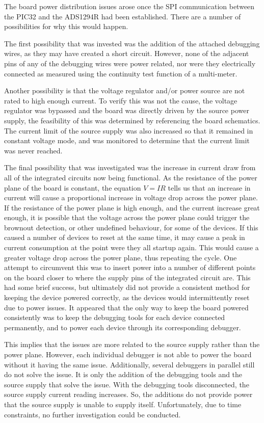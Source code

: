 The board power distribution issues arose once the SPI communication between the PIC32 and the ADS1294R had been established.
There are a number of possibilities for why this would happen.

The first possibility that was invested was the addition of the attached debugging wires, as they may have created a short circuit.
However, none of the adjacent pins of any of the debugging wires were power related,
nor were they electrically connected as measured using the continuity test function of a multi-meter.

Another possibility is that the voltage regulator and/or power source are not rated to high enough current.
To verify this was not the cause, the voltage regulator was bypassed and the board was directly driven by the source power supply,
the feasibility of this was determined by referencing the board schematics.
The current limit of the source supply was also increased so that it remained in constant voltage mode,
and was monitored to determine that the current limit was never reached.

The final possibility that was investigated was the increase in current draw from all of the integrated circuits now being functional.
As the resistance of the power plane of the board is constant,
the equation \(V = IR\) tells us that an increase in current will cause a proportional increase in voltage drop across the power plane.
If the resistance of the power plane is high enough, and the current increase great enough,
it is possible that the voltage across the power plane could trigger the brownout detection, or other undefined behaviour, for some of the devices.
If this caused a number of devices to reset at the same time, it may cause a peak in current consumption at the point were they all startup again.
This would cause a greater voltage drop across the power plane, thus repeating the cycle.
One attempt to circumvent this was to insert power into a number of different points on the board
closer to where the supply pins of the integrated circuit are.
This had some brief success, but ultimately did not provide a consistent method for keeping the device powered correctly,
as the devices would intermittently reset due to power issues.
It appeared that the only way to keep the board powered consistently was to keep the debugging tools for each device connected permanently,
and to power each device through its corresponding debugger.

This implies that the issues are more related to the source supply rather than the power plane.
However, each individual debugger is not able to power the board without it having the same issue.
Additionally, several debuggers in parallel still do not solve the issue.
It is only the addition of the debugging tools and the source supply that solve the issue.
With the debugging tools disconnected, the source supply current reading increases.
So, the additions do not provide power that the source supply is unable to supply itself.
Unfortunately, due to time constraints, no further investigation could be conducted.
